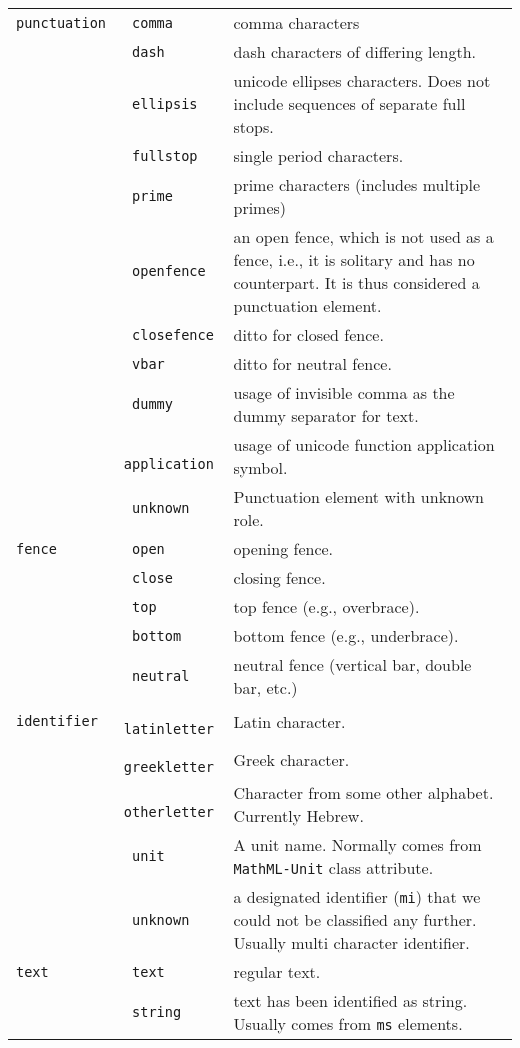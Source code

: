 \documentclass{article}
\def\mathml#1{\texttt{#1}}
\begin{document}
\begin{tabular}{>{\tt}l>{\tt}lp{11cm}}
  punctuation & comma & comma characters\\
              & dash & dash characters of differing length.\\
              & ellipsis & unicode ellipses characters. Does not include sequences of separate full stops.\\
              & fullstop & single period characters.\\
              & prime & prime characters (includes multiple primes)\\
              & openfence & an open fence, which is not used as a fence, i.e., it is solitary
                            and has no counterpart. It is thus considered a punctuation element.\\
              & closefence & ditto for closed fence.\\
              & vbar & ditto for neutral fence.\\
              & dummy & usage of invisible comma as the dummy separator for text.\\
              & application & usage of unicode function application symbol.\\
              & unknown & Punctuation element with unknown role.\\
  fence & open & opening fence.\\
              & close & closing fence.\\
              & top & top fence (e.g., overbrace).\\
              & bottom & bottom fence (e.g., underbrace).\\
              & neutral & neutral fence (vertical bar, double bar, etc.)\\
  identifier & latinletter & Latin character.\\
              & greekletter & Greek character.\\
              & otherletter & Character from some other alphabet. Currently Hebrew.\\
              & unit & A unit name. Normally comes from \mathml{MathML-Unit} class attribute.\\
              & unknown & a designated identifier (\mathml{mi}) that we could not be classified any
                          further. Usually multi character identifier.\\
  text   & text & regular text.\\
              & string & text has been identified as string. Usually comes from \mathml{ms} elements.\\

\end{tabular}
\end{document}
